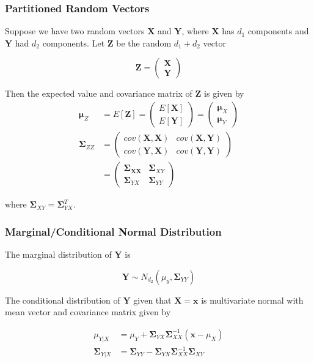 \documentclass{beamer}
\begin{document}
\begin{frame}
\frametitle{Partitioned Random Vectors}
Suppose we have two random vectors $\mathbf{X}$ and $\mathbf{Y}$, where $\mathbf{X}$ has $d_1$ components and $\mathbf{Y}$ had $d_2$ components.  Let $\mathbf{Z}$ be the random $d_1 + d_2$ vector

$$\mathbf{Z} = \begin{pmatrix} \mathbf{X} \\ \mathbf{Y} \end{pmatrix}$$

Then the expected value and covariance matrix of $\mathbf{Z}$ is given by 
\begin{align*}
\mathbf{\mu}_Z &= E[\mathbf{Z}] = \begin{pmatrix} E[\mathbf{X}] \\ E[\mathbf{Y}] \end{pmatrix} = \begin{pmatrix} \mathbf{\mu}_X \\ \mathbf{\mu}_Y \end{pmatrix}\\
\mathbf{\Sigma}_{ZZ} &= \begin{pmatrix} cov(\mathbf{X}, \mathbf{X}) & cov(\mathbf{X}, \mathbf{Y}) \\ cov(\mathbf{Y}, \mathbf{X}) & cov(\mathbf{Y}, \mathbf{Y})  \end{pmatrix}\\
&= \begin{pmatrix}
\mathbf{\Sigma_{XX}} & \mathbf{\Sigma}_{XY}\\
\mathbf{\Sigma}_{YX} & \mathbf{\Sigma}_{YY}
\end{pmatrix}
\end{align*}

where $\mathbf{\Sigma}_{XY} = \mathbf{\Sigma}_{YX}^T$. 
\end{frame}

\begin{frame}
\frametitle{Marginal/Conditional Normal Distribution}
The marginal distribution of $\mathbf{Y}$ is

$$\mathbf{Y} \sim N_{d_2}(\mu_y, \mathbf{\Sigma}_{YY})$$

The conditional distribution of $\mathbf{Y}$ given that $\mathbf{X} = \mathbf{x}$ is multivariate normal with mean vector and covariance matrix given by

\begin{align*}
\mu_{Y|X} &= \mu_Y + \mathbf{\Sigma}_{YX} \mathbf{\Sigma}_{XX}^{-1} (\mathbf{x} - \mu_X)\\
\mathbf{\Sigma}_{Y|X} &= \mathbf{\Sigma}_{YY} - \mathbf{\Sigma}_{YX}\mathbf{\Sigma}_{XX}^{-1}\mathbf{\Sigma}_{XY}
\end{align*}

\end{frame}
\end{document}
